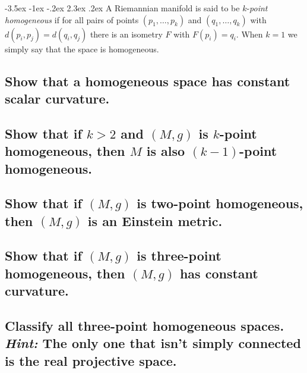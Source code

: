 \documentclass[10pt]{article}
\makeatletter
\renewcommand\section{\@startsection{section}{1}{\z@}%
                                  {-3.5ex \@plus -1ex \@minus -.2ex}%
                                  {2.3ex \@plus.2ex}%
                                  {\normalfont\large\bfseries}}
\DeclareMathOperator{\2}{II}
\newcommand{\hint}[1]{{\emph{Hint:} #1}} %
\makeatother
\begin{document}
\section{A Riemannian manifold is said to be $k$-\emph{point homogeneous} if for all pairs of points $(p_1, \dots, p_k)$ and $(q_1, \dots, q_k)$ with $d(p_i, p_j) = d(q_i, q_j)$ there is an isometry $F$ with $F(p_i) = q_i$. When $k=1$ we simply say that the space is homogeneous.}
\subsection{Show that a homogeneous space has constant scalar curvature.}
\subsection{Show that if $k > 2$ and $(M,g)$ is $k$-point homogeneous, then $M$ is also $(k-1)$-point homogeneous.}
\subsection{Show that if $(M,g)$ is two-point homogeneous, then $(M,g)$ is an Einstein metric.}
\subsection{Show that if $(M,g)$ is three-point homogeneous, then $(M,g)$ has constant curvature.}
\subsection{Classify all three-point homogeneous spaces. \hint{The only one that isn't simply connected is the real projective space.}}
\end{document}
